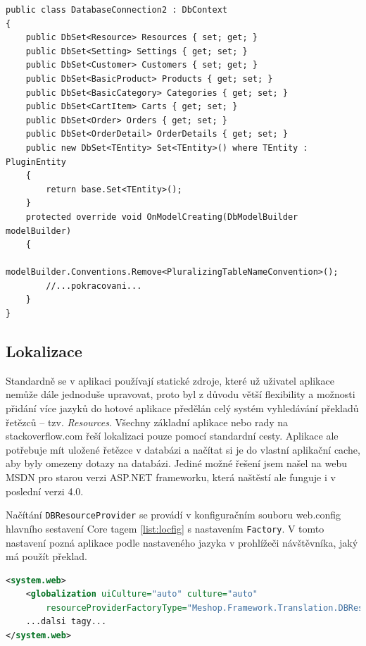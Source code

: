 \documentclass[11pt,twoside,a4paper]{book}
\begin{document}
\begin{lstlisting}[float=h!,language=CSharp, caption={Specifikace třídy DbContext}, label=list:dbcontext]
public class DatabaseConnection2 : DbContext
{
    public DbSet<Resource> Resources { set; get; }
    public DbSet<Setting> Settings { get; set; }
    public DbSet<Customer> Customers { set; get; }
    public DbSet<BasicProduct> Products { get; set; }
    public DbSet<BasicCategory> Categories { get; set; }
    public DbSet<CartItem> Carts { get; set; }
    public DbSet<Order> Orders { get; set; }
    public DbSet<OrderDetail> OrderDetails { get; set; }
    public new DbSet<TEntity> Set<TEntity>() where TEntity : PluginEntity
    {
        return base.Set<TEntity>();
    }
    protected override void OnModelCreating(DbModelBuilder modelBuilder)
    {
        modelBuilder.Conventions.Remove<PluralizingTableNameConvention>();
        //...pokracovani...
	}
}
\end{lstlisting}


\subsection{Lokalizace}
\label{subsec:lokalizace}
Standardně se v aplikaci používají statické zdroje, které už uživatel aplikace nemůže dále jednoduše upravovat, proto byl z důvodu větší flexibility a možnosti přidání více jazyků do hotové aplikace předělán celý systém vyhledávání překladů řetězců -- tzv. \textsl{Resources}. Všechny základní aplikace nebo rady na stackoverflow.com řeší lokalizaci pouze pomocí standardní cesty. Aplikace ale potřebuje mít uložené řetězce v databázi a načítat si je do vlastní aplikační cache, aby byly omezeny dotazy na databázi. Jediné možné řešení jsem našel na webu MSDN \cite{resources} pro starou verzi ASP.NET frameworku, která naštěstí ale funguje i v poslední verzi 4.0.

Načítání \texttt{DBResourceProvider} se provádí v konfiguračním souboru \textsf{web.config} hlavního sestavení \textsf{Core} tagem \ref{list:locfig} s nastavením \texttt{Factory}. V tomto nastavení pozná aplikace podle nastaveného jazyka v prohlížeči návštěvníka, jaký má použít překlad.

\begin{lstlisting}[float=h!,language=XML, caption={Konfigurace DBResourceProvider v lokalizaci}, label=list:locfig]
<system.web>
	<globalization uiCulture="auto" culture="auto" 
		resourceProviderFactoryType="Meshop.Framework.Translation.DBResourceProviderFactory, Meshop.Framework" />
	...dalsi tagy...
</system.web>
\end{lstlisting}
\end{document}
